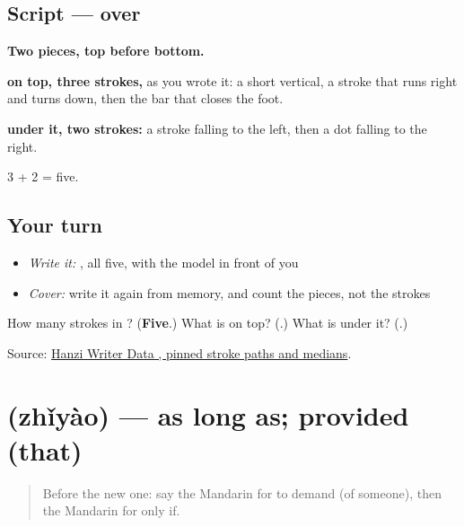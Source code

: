 \subsection*{Script —  over }

\begin{quote}
\end{quote}

\textbf{Two pieces, top before bottom.}

\textbf{ on top, three strokes,} as you wrote it: a short vertical, a stroke that runs right and turns down, then the bar that closes the foot.

\textbf{ under it, two strokes:} a stroke falling to the left, then a dot falling to the right.

3 + 2 = five.

\subsection*{Your turn}
\begin{itemize}
\raggedright
  \item \emph{Write it:} , all five, with the model in front of you
  \item \emph{Cover:} write it again from memory, and count the pieces, not the strokes
\end{itemize}

\begin{tcolorbox}[breakable,colback=teal!4,colframe=teal!35!black,title={Before you move on}]
How many strokes in ? (\textbf{Five}.) What is on top? (\textbf{}.) What is under it? (\textbf{}.)

Source: \href{https://raw.githubusercontent.com/chanind/hanzi-writer-data/68d10a4b21150cae5e1ebbd223eed289cf32d90c/data/\%E5\%8F\%AA.json}{Hanzi Writer Data , pinned stroke paths and medians}.
\end{tcolorbox}
\section[\texorpdfstring{\zh{只要} (zhǐyào)}{只要 (zhǐyào)}]{ (zhǐyào) — as long as; provided (that)}

\label{lesson:ZH-C399-zhiyao}



\begin{quote}
Before the new one: say the Mandarin for to demand (of someone), then the Mandarin for only if.
\end{quote}

